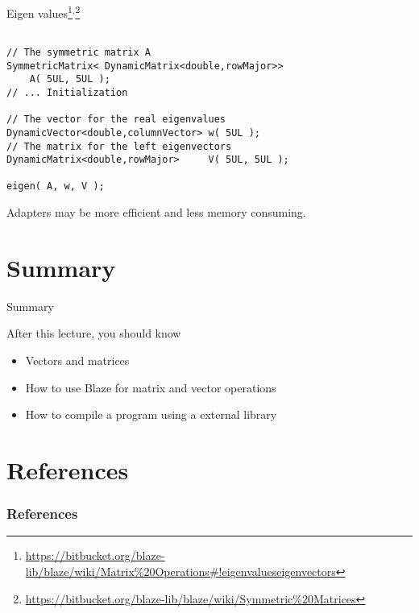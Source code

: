\documentclass[12pt,t]{beamer}
\begin{document}
\begin{frame}[fragile]{Eigen values\footnote{\tiny\url{https://bitbucket.org/blaze-lib/blaze/wiki/Matrix\%20Operations\#!eigenvalueseigenvectors}}$^,$\footnote{\tiny\url{https://bitbucket.org/blaze-lib/blaze/wiki/Symmetric\%20Matrices}}}
\begin{lstlisting}

// The symmetric matrix A
SymmetricMatrix< DynamicMatrix<double,rowMajor>> 
    A( 5UL, 5UL );  
// ... Initialization

// The vector for the real eigenvalues
DynamicVector<double,columnVector> w( 5UL );    
// The matrix for the left eigenvectors   
DynamicMatrix<double,rowMajor>     V( 5UL, 5UL );  

eigen( A, w, V );
\end{lstlisting}

\begin{center}
Adapters may be more efficient and less memory consuming.
\end{center}
\end{frame}


\section{Summary}
\begin{frame}{Summary}
\begin{block}{After this lecture, you should know}
\begin{itemize}
\item Vectors and matrices
\item How to use Blaze for matrix and vector operations
\item How to compile a program using a external library
\end{itemize}
\end{block}
\end{frame}


\section{References}

\begin{frame}[t, allowframebreaks]
\frametitle{References}


\end{frame}
\end{document}
